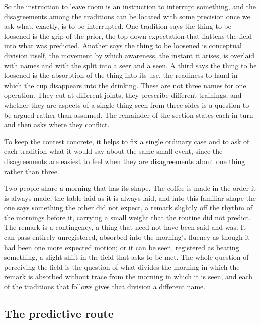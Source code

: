 So the instruction to leave room is an instruction to interrupt something, and the disagreements among the traditions can be located with some precision once we ask what, exactly, is to be interrupted. One tradition says the thing to be loosened is the grip of the prior, the top-down expectation that flattens the field into what was predicted. Another says the thing to be loosened is conceptual division itself, the movement by which awareness, the instant it arises, is overlaid with names and with the split into a seer and a seen. A third says the thing to be loosened is the absorption of the thing into its use, the readiness-to-hand in which the cup disappears into the drinking. These are not three names for one operation. They cut at different joints, they prescribe different trainings, and whether they are aspects of a single thing seen from three sides is a question to be argued rather than assumed. The remainder of the section states each in turn and then asks where they conflict.

To keep the contest concrete, it helps to fix a single ordinary case and to ask of each tradition what it would say about the same small event, since the disagreements are easiest to feel when they are disagreements about one thing rather than three.

\begin{casebox}
Two people share a morning that has its shape. The coffee is made in the order it is always made, the table laid as it is always laid, and into this familiar shape the one says something the other did not expect, a remark slightly off the rhythm of the mornings before it, carrying a small weight that the routine did not predict. The remark is a contingency, a thing that need not have been said and was. It can pass entirely unregistered, absorbed into the morning's fluency as though it had been one more expected motion; or it can be seen, registered as bearing something, a slight shift in the field that asks to be met. The whole question of perceiving the field is the question of what divides the morning in which the remark is absorbed without trace from the morning in which it is seen, and each of the traditions that follows gives that division a different name.
\end{casebox}

\subsection{The predictive route}
\label{p22:sub:perception-predictive}

